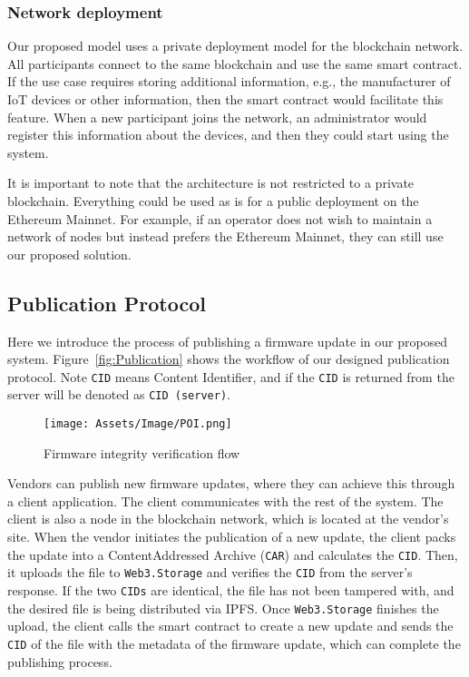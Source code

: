 \documentclass[conference]{IEEEtran}
\begin{document}
\subsubsection{Network deployment}

Our proposed model uses a private deployment model for the blockchain network. All participants connect to the same blockchain and use the same smart contract. If the use case requires storing additional information, e.g., the manufacturer of IoT devices or other information, then the smart contract would facilitate this feature. When a new participant joins the network, an administrator would register this information about the devices, and then they could start using the system.

It is important to note that the architecture is not restricted to a private blockchain. Everything could be used as is for a public deployment on the Ethereum Mainnet. For example, if an operator does not wish to maintain a network of nodes but instead prefers the Ethereum Mainnet, they can still use our proposed solution. %

\subsection{Publication Protocol}

Here we introduce the process of publishing a firmware update in our proposed system. Figure~\ref{fig:Publication} shows the workflow of our designed publication protocol. Note \texttt{CID} means Content Identifier, and if the \texttt{CID} is returned from the server will be denoted as \texttt{CID (server)}.



\begin{figure*}[t]
\centering
\texttt{[image: Assets/Image/POI.png]}
\caption{Firmware integrity verification flow}
\label{fig:POI}
\vspace{-3mm}
\end{figure*}

Vendors can publish new firmware updates, where they can achieve this through a client application. The client communicates with the rest of the system. The client is also a node in the blockchain network, which is located at the vendor's site. When the vendor initiates the publication of a new update, the client packs the update into a ContentAddressed
Archive (\texttt{CAR}) and calculates the \texttt{CID}. Then, it uploads the file to \texttt{Web3.Storage} and verifies the \texttt{CID} from the server's response. If the two \texttt{CIDs} are identical, the file has not been tampered with, and the desired file is being distributed via IPFS. Once \texttt{Web3.Storage} finishes the upload, the client calls the smart contract to create a new update and sends the \texttt{CID} of the file with the metadata of the firmware update, which can complete the publishing process.
\end{document}
